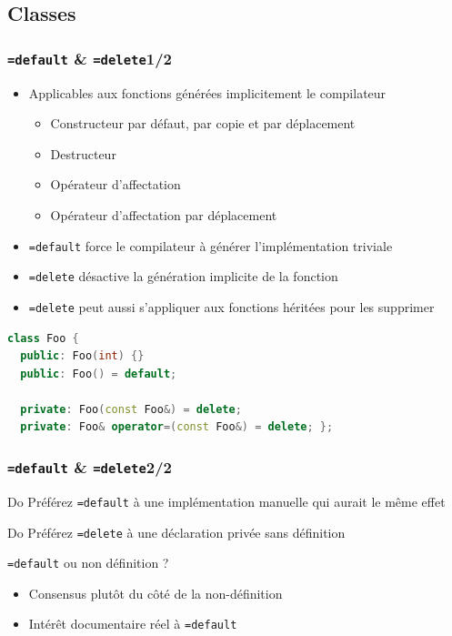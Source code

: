\documentclass[C++.tex]{subfiles}
\begin{document}
\subsection*{Classes}
\begin{frame}[fragile]
	\frametitle{\lstinline|=default| \& \lstinline|=delete|\titlehfill{}1/2}
	\begin{itemize}
		\item Applicables aux fonctions générées implicitement le compilateur
		\begin{itemize}
			\item Constructeur par défaut, par copie et par déplacement
			\item Destructeur
			\item Opérateur d'affectation
			\item Opérateur d'affectation par déplacement
		\end{itemize}
		\item \lstinline|=default| force le compilateur à générer l'implémentation \og triviale\fg{}
		\item \lstinline|=delete| désactive la génération implicite de la fonction
		\item \lstinline|=delete| peut aussi s'appliquer aux fonctions héritées pour les supprimer
	\end{itemize}


	\begin{lstlisting}[language=C++]
class Foo {
  public: Foo(int) {}
  public: Foo() = default;

  private: Foo(const Foo&) = delete;
  private: Foo& operator=(const Foo&) = delete; };\end{lstlisting}
\end{frame}

\begin{frame}[fragile]
	\frametitle{\lstinline|=default| \& \lstinline|=delete|\titlehfill{}2/2}
	\begin{exampleblock}{Do}
		Préférez \lstinline|=default| à une implémentation manuelle qui aurait le même effet
	\end{exampleblock}

	\begin{exampleblock}{Do}
		Préférez \lstinline|=delete| à une déclaration privée sans définition
	\end{exampleblock}

	\begin{block}{\lstinline|=default| ou non définition ?}
		\begin{itemize}
			\item Consensus plutôt du côté de la non-définition
			\item Intérêt documentaire réel à \lstinline|=default|
		\end{itemize}
	\end{block}
\end{frame}
\end{document}
